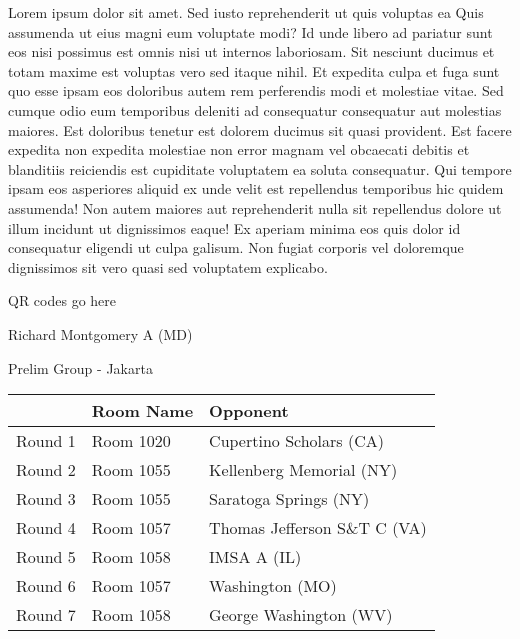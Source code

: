 \documentclass{article}%
\begin{document}
\vspace*{8pt}%
\linebreak%
\newline%
\newline%
Lorem ipsum dolor sit amet. Sed iusto reprehenderit ut quis voluptas ea Quis assumenda ut eius magni eum voluptate modi? Id unde libero ad pariatur sunt eos nisi possimus est omnis nisi ut internos laboriosam. Sit nesciunt ducimus et totam maxime est voluptas vero sed itaque nihil. Et expedita culpa et fuga sunt quo esse ipsam eos doloribus autem rem perferendis modi et molestiae vitae.\newline%
\newline%
Sed cumque odio eum temporibus deleniti ad consequatur consequatur aut molestias maiores. Est doloribus tenetur est dolorem ducimus sit quasi provident. Est facere expedita non expedita molestiae non error magnam vel obcaecati debitis et blanditiis reiciendis est cupiditate voluptatem ea soluta consequatur. Qui tempore ipsam eos asperiores aliquid ex unde velit est repellendus temporibus hic quidem assumenda!\newline%
\newline%
Non autem maiores aut reprehenderit nulla sit repellendus dolore ut illum incidunt ut dignissimos eaque! Ex aperiam minima eos quis dolor id consequatur eligendi ut culpa galisum. Non fugiat corporis vel doloremque dignissimos sit vero quasi sed voluptatem explicabo.\newline%
\newline%
%
\vspace*{30pt}%
\begin{center}%
\begin{Huge}%
QR codes go here%
\end{Huge}%
\end{center}%
\newpage%
%
\begin{center}%
\begin{Huge}%
Richard Montgomery A (MD)%
\end{Huge}%
\vspace*{8pt}%
\linebreak%
\begin{Large}%
Prelim Group {-} Jakarta%
\end{Large}%
\end{center}%
\begin{tabularx}{\textwidth}{|c|Y|Y|}%
\hline%
&Room Name&Opponent\\%
\hline%
Round 1&Room 1020&Cupertino Scholars (CA)\\%
Round 2&Room 1055&Kellenberg Memorial (NY)\\%
Round 3&Room 1055&Saratoga Springs (NY)\\%
Round 4&Room 1057&Thomas Jefferson S\&T C (VA)\\%
Round 5&Room 1058&IMSA A (IL)\\%
Round 6&Room 1057&Washington (MO)\\%
Round 7&Room 1058&George Washington (WV)\\%
\hline%
\end{tabularx}%
\end{document}
